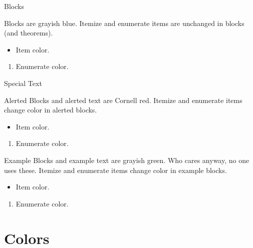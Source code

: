\documentclass[serif]{beamer}
\begin{document}
\begin{frame}{Blocks}

\begin{block}{Blocks}
are grayish blue. Itemize and enumerate items are unchanged in blocks (and theorems).
\begin{itemize}
\item Item color.
\end{itemize}
\begin{enumerate}
\item Enumerate color.
\end{enumerate}
\end{block}


\end{frame}


\begin{frame}{Special Text}

\begin{alertblock}{Alerted Blocks}
and alerted text are Cornell red. Itemize and enumerate items change color in alerted blocks.
\begin{itemize}
\item Item color.
\end{itemize}
\begin{enumerate}
\item Enumerate color.
\end{enumerate}
\end{alertblock}

\begin{exampleblock}{Example Blocks}
and example text are grayish green. Who cares anyway, no one uses these. Itemize and enumerate items change color in example blocks.
\begin{itemize}
\item Item color.
\end{itemize}
\begin{enumerate}
\item Enumerate color.
\end{enumerate}
\end{exampleblock}

\end{frame}

\section{Colors}
\end{document}
